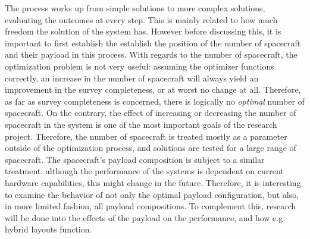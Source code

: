 The process works up from simple solutions to more complex solutions, evaluating the outcomes at every step. This is mainly related to how much freedom the solution of the system has. However before discussing this, it is important to first establish the establish the position of the number of spacecraft and their payload in this process. With regards to the number of spacecraft, the optimization problem is not very useful: assuming the optimizer functions correctly, an increase in the number of spacecraft will always yield an improvement in the survey completeness, or at worst no change at all. Therefore, as far as survey completeness is concerned, there is logically no \textit{optimal} number of spacecraft. On the contrary, the effect of increasing or decreasing the number of spacecraft in the system is one of the most important goals of the research project. Therefore, the number of spacecraft is treated mostly as a parameter outside of the optimization process, and solutions are tested for a large range of spacecraft. The spacecraft's payload composition is subject to a similar treatment: although the performance of the systems is dependent on current hardware capabilities, this might change in the future. Therefore, it is interesting to examine the behavior of not only the optimal payload configuration, but also, in more limited fashion, all payload compositions. To complement this, research will be done into the effects of the payload on the performance, and how e.g. hybrid layouts function.\\

